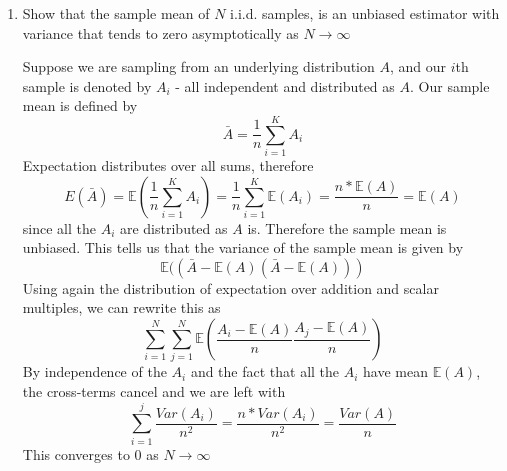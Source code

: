 \documentclass{article}
\newcommand{\chapternumber}{2}
\newenvironment{QandA}{\begin{enumerate}[label=\chapternumber.\arabic*]\bfseries\boldmath}
	{\end{enumerate}}
\newenvironment{answered}{\par\bigskip\normalfont\unboldmath}{}
\begin{document}
\begin{QandA}
\begin{answered}
		since the integrand above is just the pdf of the Dirichlet distribution with parameter vector $c$. This gives the value of the $i,j$th element as
		\[\frac{a_ia_j}{\bar{a}}\left(\frac{1}{\bar{a}+1}-\frac{1}{\bar{a}}\right)=-\frac{a_ia_j}{\bar{a}^2(\bar{a}+1)}\]
		If instead $i=j$, then define $d$ s.t. $d_k=a_k$ for $k\neq i$ and $d_i=a_i+2$. So our expression for the $i,i$th element becomes
		\[\frac{a_i(a_i+1)}{\bar{a}(\bar{a}+1)}\int_D\frac{\Gamma(\bar{d})}{\Gamma(d_1)...\Gamma(d_k)}\prod_{k=1}^Kx_k^{d_k-1}dx-\frac{a_i^2}{\bar{a}^2}\]
		As with the previous examples, the integral just evaluates to 1, so this simplifies to
		\[\frac{a_i}{\bar{a}(\bar{a}+1)}+\frac{a_i^2}{\bar{a}}\left(\frac{1}{\bar{a}+1}-\frac{1}{\bar{a}}\right)=\frac{\bar{a}a_i-a_i^2}{\bar{a}^2(\bar{a}+1)}\]
		When we consider this across all $i,j$, we get the proposed expression for covariance.
	\end{answered}
		
		
	\item Show that the sample mean of $N$ i.i.d. samples, is an unbiased estimator with variance that tends to zero asymptotically as $N\rightarrow\infty$
	\begin{answered}
		Suppose we are sampling from an underlying distribution $A$, and our $i$th sample is denoted by $A_i$ - all independent and distributed as $A$. Our sample mean is defined by
		\[\bar{A}=\frac{1}{n}\sum_{i=1}^{K}A_i\]
		Expectation distributes over all sums, therefore
		\[E(\bar{A})=\mathbb{E}\left(\frac{1}{n}\sum_{i=1}^{K}A_i\right)=\frac{1}{n}\sum_{i=1}^{K}\mathbb{E}(A_i)=\frac{n*\mathbb{E}(A)}{n}=\mathbb{E}(A)\]
		since all the $A_i$ are distributed as $A$ is. Therefore the sample mean is unbiased.
		This tells us that the variance of the sample mean is given by 
		\[\mathbb{E}((\bar{A}-\mathbb{E}(A)(\bar{A}-\mathbb{E}(A)))\]
		Using again the distribution of expectation over addition and scalar multiples, we can rewrite this as
		\[\sum_{i=1}^N\sum_{j=1}^N\mathbb{E}\left(\frac{A_i-\mathbb{E}(A)}{n}\frac{A_j-\mathbb{E}(A)}{n}\right)\]
		By independence of the $A_i$ and the fact that all the $A_i$ have mean $\mathbb{E}(A)$, the cross-terms cancel and we are left with
		\[\sum_{i=1}^j\frac{Var(A_i)}{n^2}=\frac{n*Var(A_i)}{n^2} = \frac{Var(A)}{n}\]
		This converges to 0 as $N\rightarrow\infty$
	\end{answered}
	

\end{QandA}
\end{document}
